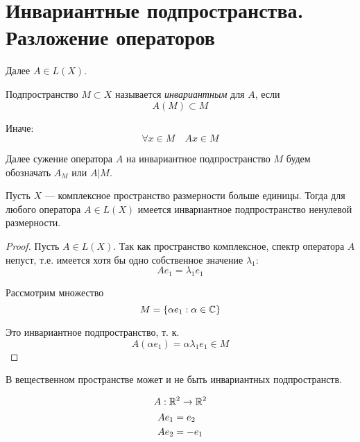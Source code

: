 \section{Инвариантные подпространства. Разложение операторов}
Далее $A \in L(X)$.

\begin{definition}
    Подпространство $ M \subset X $ называется \emph{инвариантным} для $A$, если
    \[ A(M) \subset M \]

    Иначе:
    \[ \forall x \in M \quad Ax \in M \]
\end{definition}

Далее сужение оператора $A$ на инвариантное подпространство $M$ будем обозначать
$A_M$ или $A \vert M $.

\begin{theorem} \label{th:invariantexists}
    Пусть $X$ — комплексное пространство размерности больше единицы. Тогда для
    любого оператора $A \in L(X)$ имеется инвариантное подпространство ненулевой
    размерности.
\end{theorem}
\begin{proof}
    Пусть $A\in L(X)$. Так как пространство комплексное, спектр оператора $A$
    непуст, т.е. имеется хотя бы одно собственное значение $\lambda_1$:
    \[ Ae_1 = \lambda_1 e_1 \]
    
    Рассмотрим множество
    \[ M = \left\{ \alpha e_1 : \alpha \in \mathbb{C} \right\} \]

    Это инвариантное подпространство, т. к.
    \[  A(\alpha e_1) = \alpha \lambda_1 e_1 \in M \]
\end{proof}

\begin{remark}
    В вещественном пространстве может и не быть инвариантных подпространств.
\end{remark}
\begin{example}
    \begin{gather*}
        A : \mathbb{R}^2 \to \mathbb{R}^2 \\  
        \begin{aligned}
            A e_1 &= e_2 \\
            A e_2 &= -e_1
        \end{aligned}
    \end{gather*}
\end{example}

